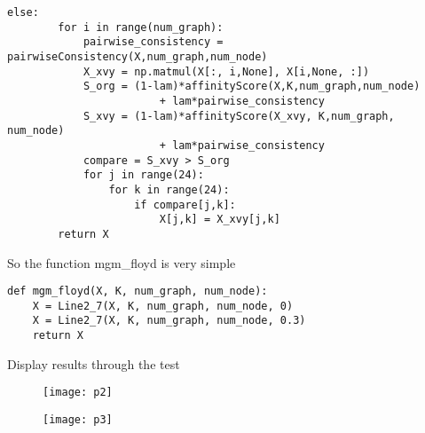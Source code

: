 \documentclass[11pt, oneside]{article}   	%
\begin{document}
\begin{itemize}
\begin{lstlisting}[language={[ANSI]C},keywordstyle=\color{blue!70},commentstyle=\color{red!50!green!50!blue!50},frame=shadowbox, rulesepcolor=\color{red!20!green!20!blue!20}]
    else:
        for i in range(num_graph):
            pairwise_consistency = pairwiseConsistency(X,num_graph,num_node)
            X_xvy = np.matmul(X[:, i,None], X[i,None, :])
            S_org = (1-lam)*affinityScore(X,K,num_graph,num_node) 
            			+ lam*pairwise_consistency
            S_xvy = (1-lam)*affinityScore(X_xvy, K,num_graph, num_node) 
            			+ lam*pairwise_consistency
            compare = S_xvy > S_org
            for j in range(24):
                for k in range(24):
                    if compare[j,k]:
                        X[j,k] = X_xvy[j,k]
        return X
\end{lstlisting}
So the function mgm\_floyd is very simple
\begin{lstlisting}[language={[ANSI]C},keywordstyle=\color{blue!70},commentstyle=\color{red!50!green!50!blue!50},frame=shadowbox, rulesepcolor=\color{red!20!green!20!blue!20}] 
def mgm_floyd(X, K, num_graph, num_node):
    X = Line2_7(X, K, num_graph, num_node, 0)
    X = Line2_7(X, K, num_graph, num_node, 0.3)
    return X
\end{lstlisting}
Display results through the test
\begin{figure}[H]
   \centering
   \texttt{[image: p2]} %
\end{figure}
\begin{figure}[H]
   \centering
   \texttt{[image: p3]} %
\end{figure}

\end{itemize}
\end{document}
